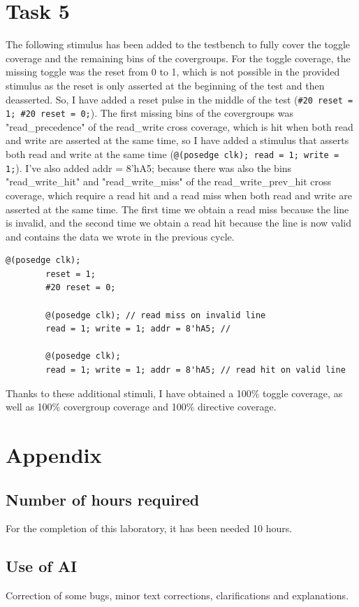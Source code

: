 \documentclass{article}
\begin{document}
\section*{Task 5}
The following stimulus has been added to the testbench to fully cover the toggle coverage and the remaining bins of the covergroups.
For the toggle coverage, the missing toggle was the reset from 0 to 1, which is not possible in the provided stimulus as the reset is only asserted at the beginning of the test and then deasserted. So, I have added a reset pulse in the middle of the test (\texttt{\#20 reset = 1; \#20 reset = 0;}).
The first missing bins of the covergroups was "read\_precedence" of the read\_write cross coverage, which is hit when both read and write are asserted at the same time, so I have added a stimulus that asserts both read and write at the same time (\texttt{@(posedge clk); read = 1; write = 1;}).
I've also added addr = 8'hA5; because there was also the bins "read\_write\_hit" and "read\_write\_miss" of the read\_write\_prev\_hit cross coverage, which require a read hit and a read miss when both read and write are asserted at the same time. The first time we obtain a read miss because the line is invalid, and the second time we obtain a read hit because the line is now valid and contains the data we wrote in the previous cycle.
\begin{verbatim}
@(posedge clk);
        reset = 1; 
        #20 reset = 0;

        @(posedge clk); // read miss on invalid line
        read = 1; write = 1; addr = 8'hA5; //

        @(posedge clk);
        read = 1; write = 1; addr = 8'hA5; // read hit on valid line
\end{verbatim}

Thanks to these additional stimuli, I have obtained a 100\% toggle coverage, as well as 100\% covergroup coverage and 100\% directive coverage.


\newpage
\section{Appendix}
\subsection{Number of hours required}
For the completion of this laboratory, it has been needed 10 hours. 
\subsection{Use of AI}
Correction of some bugs, minor text corrections, clarifications and explanations.
\end{document}
